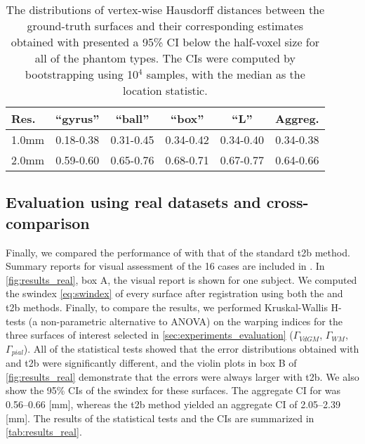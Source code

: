 \begin{table}
    \centering
    \footnotesize
    \tabcolsep=0.1cm
    \begin{tabular}{lccccc}
    Res.   & ``gyrus'' & ``ball''  & ``box''   & ``L''     & Aggreg.    \\\hline
    1.0mm  & 0.18-0.38 & 0.31-0.45 & 0.34-0.42 & 0.34-0.40 & 0.34-0.38  \\
    2.0mm  & 0.59-0.60 & 0.65-0.76 & 0.68-0.71 & 0.67-0.77 & 0.64-0.66  \\
    \hline
    \end{tabular}
    \caption{The distributions of vertex-wise Hausdorff distances between the ground-truth surfaces and their
    corresponding estimates obtained with \regseg{} presented a 95\% CI below the half-voxel size for all of
    the phantom types.
    The CIs were computed by bootstrapping using 10$^4$ samples, with the median as the location statistic.}\label{tab:ci_phantom}
\end{table}

\subsection{Evaluation using real datasets and cross-comparison}\label{sec:results_hcp}
Finally, we compared the performance of \regseg{} with that of the standard \gls*{t2b}
  method.
Summary reports for visual assessment of the 16 cases are included in .
In \autoref{fig:results_real}, box A, the visual report is shown for one subject.
We computed the \gls*{swindex} \eqref{eq:swindex} of every surface after registration
  using both the \regseg{} and \gls*{t2b} methods.
Finally, to compare the results, we performed Kruskal-Wallis H-tests
  (a non-parametric alternative to ANOVA) on the warping indices for the three surfaces of
  interest selected in \autoref{sec:experiments_evaluation}
  ($\Gamma_{VdGM}$, $\Gamma_{WM}$, $\Gamma_{pial}$).
All of the statistical tests showed that the error distributions obtained with \regseg{} and
  \gls*{t2b} were significantly different, and the violin plots in box B of
  \autoref{fig:results_real} demonstrate that the errors were always larger with \gls*{t2b}.
We also show the 95\% CIs of the \gls*{swindex} for these surfaces.
The aggregate CI for \regseg{} was 0.56--0.66 [mm], whereas the \gls*{t2b} method
  yielded an aggregate CI of 2.05--2.39 [mm].
The results of the statistical tests and the CIs are summarized in \autoref{tab:results_real}.



